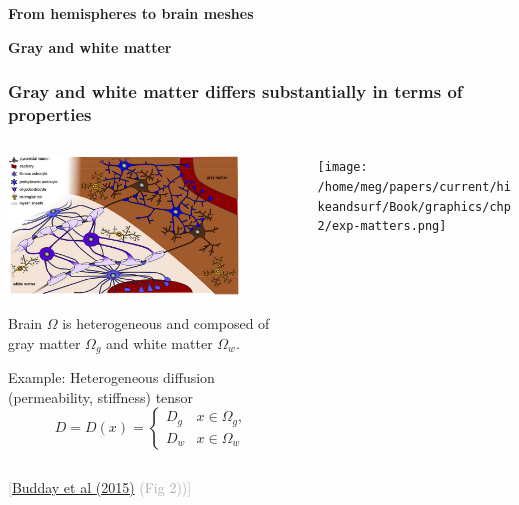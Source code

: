 \documentclass[10pt, mathserif, aspectratio=169, t]{beamer}
\newcommand{\refer}[1]{\begin{flushright}{\tiny \textcolor{darkgray}{[#1]}}\end{flushright}}
\newcommand{\mysection}[1]{\begin{frame} \begin{center} \vspace{3em} \textbf{#1} \end{center} \end{frame}}
\begin{document}
\mysection{From hemispheres to brain meshes}

\mysection{Gray and white matter}

\begin{frame}
\frametitle{Gray and white matter differs substantially in terms of properties}

\begin{columns}[T]
  \begin{column}{0.6\textwidth}
    {\centering
    \includegraphics[width=0.8\textwidth]{graphics/gray_vs_white_matter.png}
    }
    
    Brain $\Omega$ is heterogeneous and composed of gray matter
      $\Omega_g$ and white matter $\Omega_w$.

      \bigskip

      \alert{Example:} Heterogeneous diffusion (permeability,
      stiffness) tensor
      \begin{equation*}
        D =
        D(x) = \left \{
        \begin{matrix}
          D_g & x \in \Omega_g, \\
          D_w & x \in \Omega_w 
        \end{matrix}
        \right .
      \end{equation*}

  \end{column}
  \begin{column}{0.4\textwidth}
      \texttt{[image: /home/meg/papers/current/hikeandsurf/Book/graphics/chp2/exp-matters.png]}
  \end{column}
\end{columns}

\refer{\href{ https://doi.org/10.3389/fncel.2015.00257}{Budday et al (2015)} (Fig 2))}

\end{frame}
\end{document}
